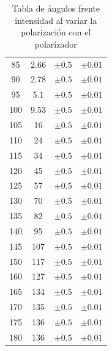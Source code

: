 \documentclass[11pt, a4paper, twocolumn]{article}
\begin{document}
\begin{table}[H]
\begin{tabular}{cccc}
                    85 &       2.66 & $\pm 0.5$             & $\pm 0.01$        \\
                    90 &       2.78 & $\pm 0.5$             & $\pm 0.01$        \\
                    95 &       5.1  & $\pm 0.5$             & $\pm 0.01$        \\
                    100 &       9.53 & $\pm 0.5$             & $\pm 0.01$        \\
                    105 &      16    & $\pm 0.5$             & $\pm 0.01$        \\
                    110 &      24    & $\pm 0.5$             & $\pm 0.01$        \\
                    115 &      34    & $\pm 0.5$             & $\pm 0.01$        \\
                    120 &      45    & $\pm 0.5$             & $\pm 0.01$        \\
                    125 &      57    & $\pm 0.5$             & $\pm 0.01$        \\
                    130 &      70    & $\pm 0.5$             & $\pm 0.01$        \\
                    135 &      82    & $\pm 0.5$             & $\pm 0.01$        \\
                    140 &      95    & $\pm 0.5$             & $\pm 0.01$        \\
                    145 &     107    & $\pm 0.5$             & $\pm 0.01$        \\
                    150 &     117    & $\pm 0.5$             & $\pm 0.01$        \\
                    160 &     127    & $\pm 0.5$             & $\pm 0.01$        \\
                    165 &     134    & $\pm 0.5$             & $\pm 0.01$        \\
                    170 &     135    & $\pm 0.5$             & $\pm 0.01$        \\
                    175 &     136    & $\pm 0.5$             & $\pm 0.01$        \\
                    180 &     136    & $\pm 0.5$             & $\pm 0.01$        \\
        \hline
    \end{tabular}
    \caption{Tabla de ángulos frente intensidad al variar la polarización con el polarizador}
    \label{Tabla_3}
\end{table}
\end{document}
